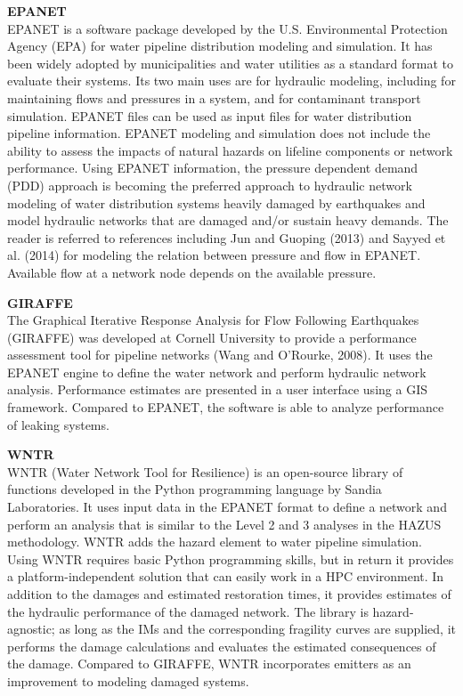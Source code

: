 \noindent\textbf{EPANET} \\EPANET is a software package developed by the U.S. Environmental Protection Agency (EPA) for water pipeline distribution modeling and simulation. It has been widely adopted by municipalities and water utilities as a standard format to evaluate their systems. Its two main uses are for hydraulic modeling, including for maintaining flows and pressures in a system, and for contaminant transport simulation. EPANET files can be used as input files for water distribution pipeline information. EPANET modeling and simulation does not include the ability to assess the impacts of natural hazards on lifeline components or network performance. Using EPANET information, the pressure dependent demand (PDD) approach is becoming the preferred approach to hydraulic network modeling of water distribution systems heavily damaged by earthquakes and model hydraulic networks that are damaged and/or sustain heavy demands. The reader is referred to references including Jun and Guoping (2013) and Sayyed et al. (2014) for modeling the relation between pressure and flow in EPANET. Available flow at a network node depends on the available pressure.
\newline

\noindent\textbf{GIRAFFE} \\The Graphical Iterative Response Analysis for Flow Following Earthquakes (GIRAFFE) was developed at Cornell University to provide a performance assessment tool for pipeline networks (Wang and O’Rourke, 2008). It uses the EPANET engine to define the water network and perform hydraulic network analysis. Performance estimates are presented in a user interface using a GIS framework. Compared to EPANET, the software is able to analyze performance of leaking systems.
\newline

\noindent\textbf{WNTR} \\WNTR (Water Network Tool for Resilience) is an open-source library of functions developed in the Python programming language by Sandia Laboratories. It uses input data in the EPANET format to define a network and perform an analysis that is similar to the Level 2 and 3 analyses in the HAZUS methodology. WNTR adds the hazard element to water pipeline simulation. Using WNTR requires basic Python programming skills, but in return it provides a platform-independent solution that can easily work in a HPC environment. In addition to the damages and estimated restoration times, it provides estimates of the hydraulic performance of the damaged network. The library is hazard-agnostic; as long as the IMs and the corresponding fragility curves are supplied, it performs the damage calculations and evaluates the estimated consequences of the damage. Compared to GIRAFFE, WNTR incorporates emitters as an improvement to modeling damaged systems.
\newline

